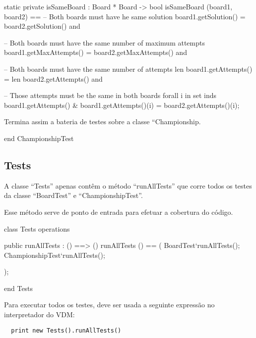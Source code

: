 \begin{vdm_al}  
    static private isSameBoard : Board * Board -> bool
    isSameBoard (board1, board2) ==
      -- Both boards must have he same solution
      board1.getSolution() = board2.getSolution() and
  
      -- Both boards must have the same number of maximum attempts
      board1.getMaxAttempts() = board2.getMaxAttempts() and
  
      -- Both boards must have the same number of attempts
      len board1.getAttempts() = len board2.getAttempts() and
  
      -- Those attempts must be the same in both boards
      forall i in set inds board1.getAttempts() &
        board1.getAttempts()(i) = board2.getAttempts()(i);
\end{vdm_al}

Termina assim a bateria de testes sobre a classe ``Championship.

\begin{vdm_al}  
  end ChampionshipTest
\end{vdm_al}
  
\subsection{Tests}

A classe ``Tests'' apenas contêm o método ``runAllTests'' que corre
todos os testes da classe ``BoardTest'' e ``ChampionshipTest''.

Esse método serve de ponto de entrada para efetuar a cobertura do
código.

\begin{vdm_al}
  class Tests
    operations
  
    public runAllTests : () ==> ()
    runAllTests () == (
      BoardTest`runAllTests();
      ChampionshipTest`runAllTests();
  
    );
  
  end Tests
\end{vdm_al}

Para executar todos os testes, deve ser usada a seguinte expressão no
interpretador do VDM:

\begin{verbatim}
  print new Tests().runAllTests()
\end{verbatim}



